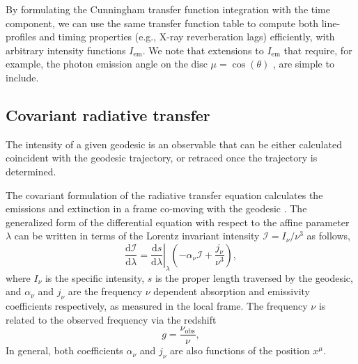 \documentclass[fleqn,usenatbib]{mnras}
\renewcommand{\d}{\text{d}}
\begin{document}
By formulating the Cunningham transfer function integration with the time
component, we can use the same transfer function table to compute both
line-profiles and timing properties (e.g., X-ray reverberation lags) efficiently, with arbitrary intensity
functions $I_\text{em}$. We note that extensions to $I_\text{em}$ that require,
for example, the photon emission angle on the disc $\mu = \cos(\theta)$ \citep{matt_reflection_1993}, are
simple to include.


\subsection{Covariant radiative transfer}

The intensity of a given geodesic is an observable that can be either calculated coincident with the geodesic trajectory, or retraced once the trajectory is determined.

The covariant formulation of the radiative transfer equation calculates the emissions and extinction in a frame co-moving with the geodesic \citep{fuerst_radiation_2004,younsi_general_2012}. The generalized form of the differential equation with respect to the affine parameter $\lambda$ can be written in terms of the Lorentz invariant intensity $\mathcal{I} = I_\nu / \nu^3$ \citep{lindquist_louville_1966} as follows,
\begin{equation}
    \label{eq:covariant-radiative-transfer}
    \frac{\d \mathcal{I}}{\d \lambda} = \left. \frac{\d s}{\d \lambda} \right\rvert_\lambda \left( -\alpha_\nu \mathcal{I} + \frac{j_\nu}{\nu^3} \right),
\end{equation}
where $I_\nu$ is the specific intensity, $s$ is the proper length traversed by the geodesic, and $\alpha_\nu$ and $j_\nu$ are the frequency $\nu$ dependent absorption and emissivity coefficients respectively, as measured in the local frame. The frequency $\nu$ is related to the observed frequency via the redshift
\begin{equation}
    g = \frac{\nu_\text{obs}}{\nu},
\end{equation}
In general, both coefficients $\alpha_\nu$ and $j_\nu$ are also functions of the position $x^\mu$.
\end{document}

